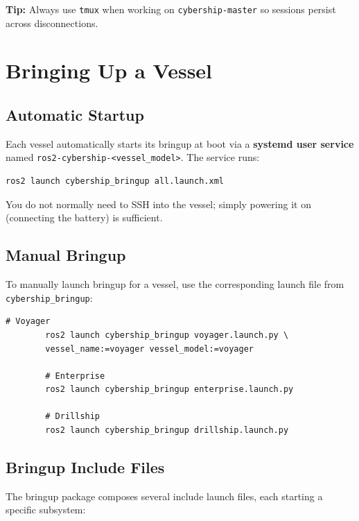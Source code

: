\documentclass[12pt,a4paper]{article}
\begin{document}
	\textbf{Tip:} Always use \texttt{tmux} when working on \texttt{cybership-master} so sessions
	persist across disconnections.
	
	\section{Bringing Up a Vessel}
	\label{sec:bringup}
	
	\subsection{Automatic Startup}
	
	Each vessel automatically starts its bringup at boot via a \textbf{systemd user service} named
	\texttt{ros2-cybership-<vessel\_model>}. The service runs:
	
	\begin{lstlisting}[style=bash]
		ros2 launch cybership_bringup all.launch.xml
	\end{lstlisting}
	
	You do not normally need to SSH into the vessel; simply powering it on (connecting the battery)
	is sufficient.
	
	\subsection{Manual Bringup}
	
	To manually launch bringup for a vessel, use the corresponding launch file from
	\texttt{cybership\_bringup}:
	
	\begin{lstlisting}[style=bash]
		# Voyager
		ros2 launch cybership_bringup voyager.launch.py \
		vessel_name:=voyager vessel_model:=voyager
		
		# Enterprise
		ros2 launch cybership_bringup enterprise.launch.py
		
		# Drillship
		ros2 launch cybership_bringup drillship.launch.py
	\end{lstlisting}
	
	\subsection{Bringup Include Files}
	
	The bringup package composes several include launch files, each starting a specific subsystem:
	
\end{document}
